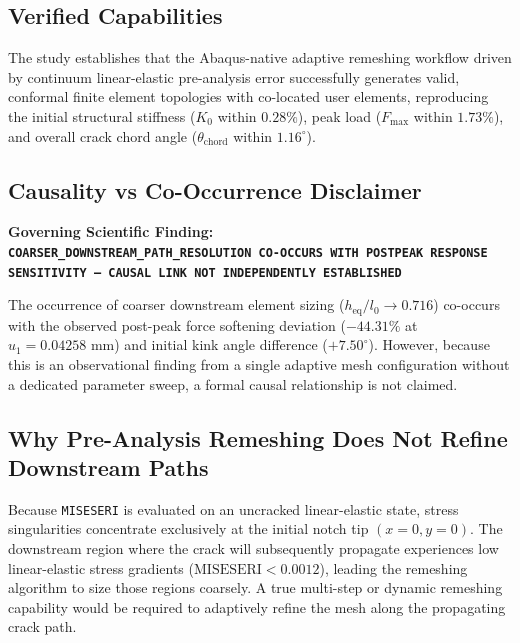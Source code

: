 \documentclass[11pt,a4paper]{article}
\begin{document}
\subsection{Verified Capabilities}
The study establishes that the Abaqus-native adaptive remeshing workflow driven by continuum linear-elastic pre-analysis error successfully generates valid, conformal finite element topologies with co-located user elements, reproducing the initial structural stiffness ($K_0$ within $0.28\%$), peak load ($F_{\max}$ within $1.73\%$), and overall crack chord angle ($\theta_{\mathrm{chord}}$ within $1.16^\circ$).

\subsection{Causality vs Co-Occurrence Disclaimer}
\begin{tcolorbox}[colback=lightgraybg,colframe=crimsonred,arc=2mm]
\textbf{Governing Scientific Finding:}\\
{\small\texttt{\textbf{COARSER\_DOWNSTREAM\_PATH\_RESOLUTION CO-OCCURS WITH POSTPEAK RESPONSE SENSITIVITY --- CAUSAL LINK NOT INDEPENDENTLY ESTABLISHED}}}
\end{tcolorbox}
The occurrence of coarser downstream element sizing ($h_{\mathrm{eq}}/l_0 \to 0.716$) co-occurs with the observed post-peak force softening deviation ($-44.31\%$ at $u_1 = 0.04258\text{ mm}$) and initial kink angle difference ($+7.50^\circ$). However, because this is an observational finding from a single adaptive mesh configuration without a dedicated parameter sweep, a formal causal relationship is not claimed.

\subsection{Why Pre-Analysis Remeshing Does Not Refine Downstream Paths}
Because \texttt{MISESERI} is evaluated on an uncracked linear-elastic state, stress singularities concentrate exclusively at the initial notch tip $(x=0, y=0)$. The downstream region where the crack will subsequently propagate experiences low linear-elastic stress gradients ($\text{MISESERI} < 0.0012$), leading the remeshing algorithm to size those regions coarsely. A true multi-step or dynamic remeshing capability would be required to adaptively refine the mesh along the propagating crack path.

\end{document}
